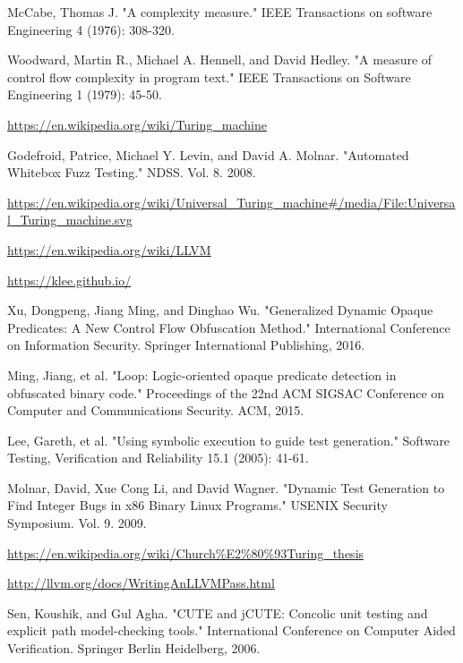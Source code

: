 \documentclass[lnicst]{svmultln}
\begin{document}
\begin{thebibliography}{5}
 McCabe, Thomas J. "A complexity measure." IEEE Transactions on software Engineering 4 (1976): 308-320.

 Woodward, Martin R., Michael A. Hennell, and David Hedley. "A measure of control flow complexity in program text." IEEE Transactions on Software Engineering 1 (1979): 45-50.

 \url{https://en.wikipedia.org/wiki/Turing_machine}

 Godefroid, Patrice, Michael Y. Levin, and David A. Molnar. "Automated Whitebox Fuzz Testing." NDSS. Vol. 8. 2008.

 \url{https://en.wikipedia.org/wiki/Universal_Turing_machine#/media/File:Universal_Turing_machine.svg}

 \url{https://en.wikipedia.org/wiki/LLVM}

 \url{https://klee.github.io/}

 Xu, Dongpeng, Jiang Ming, and Dinghao Wu. "Generalized Dynamic Opaque Predicates: A New Control Flow Obfuscation Method." International Conference on Information Security. Springer International Publishing, 2016.

 Ming, Jiang, et al. "Loop: Logic-oriented opaque predicate detection in obfuscated binary code." Proceedings of the 22nd ACM SIGSAC Conference on Computer and Communications Security. ACM, 2015.

 Lee, Gareth, et al. "Using symbolic execution to guide test generation." Software Testing, Verification and Reliability 15.1 (2005): 41-61.

 Molnar, David, Xue Cong Li, and David Wagner. "Dynamic Test Generation to Find Integer Bugs in x86 Binary Linux Programs." USENIX Security Symposium. Vol. 9. 2009.

 \url{https://en.wikipedia.org/wiki/Church%E2%80%93Turing_thesis}

 \url{http://llvm.org/docs/WritingAnLLVMPass.html}


 Sen, Koushik, and Gul Agha. "CUTE and jCUTE: Concolic unit testing and explicit path model-checking tools." International Conference on Computer Aided Verification. Springer Berlin Heidelberg, 2006.


\end{thebibliography}
\end{document}
